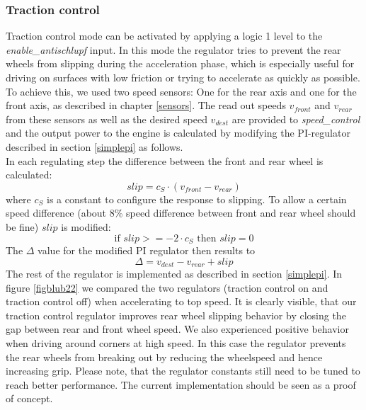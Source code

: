 \documentclass[a4paper
               ,10pt
               ,DIV=10 %
               ,BCOR=0.3cm
               ,pagesize %
               ,headings=small
               ,bibtotoc
               ]
               {scrartcl}
\begin{document}
\subsubsection{Traction control}
Traction control mode can be activated by applying a logic 1 level to the \emph{enable\_antischlupf} input. In this mode the regulator tries to prevent the rear wheels from slipping during the acceleration phase, which is especially useful for driving on surfaces with low friction or trying to accelerate as quickly as possible. To achieve this, we used two speed sensors: One for the rear axis and one for the front axis, as described in chapter \ref{sensors}. The read out speeds $v_{front}$ and $v_{rear}$ from these sensors as well as the desired speed $v_{dest}$ are provided to \emph{speed\_control} and the output power to the engine is calculated by modifying the PI-regulator described in section \ref{simplepi} as follows.\\
In each regulating step the difference between the front and rear wheel is calculated:
$$slip = c_S \cdot (v_{front} - v_{rear})$$
where $c_S$ is a constant to configure the response to slipping. To allow a certain speed difference (about 8\% speed difference between front and rear wheel should be fine) $slip$ is modified:
$$\text{if }slip>=-2\cdot c_S \text{ then }  slip = 0$$
The $\Delta$ value for the modified PI regulator then results to
$$\Delta = v_{dest} - v_{rear} + slip$$
The rest of the regulator is implemented as described in section \ref{simplepi}. In figure \ref{figblub22} we compared the two regulators (traction control on and traction control off) when accelerating to top speed. It is clearly visible, that our traction control regulator improves rear wheel slipping behavior by closing the gap between rear and front wheel speed. We also experienced positive behavior when driving around corners at high speed. In this case the regulator prevents the rear wheels from breaking out by reducing the wheelspeed and hence increasing grip. Please note, that the regulator constants still need to be tuned to reach better performance. The current implementation should be seen as a proof of concept.
\end{document}
